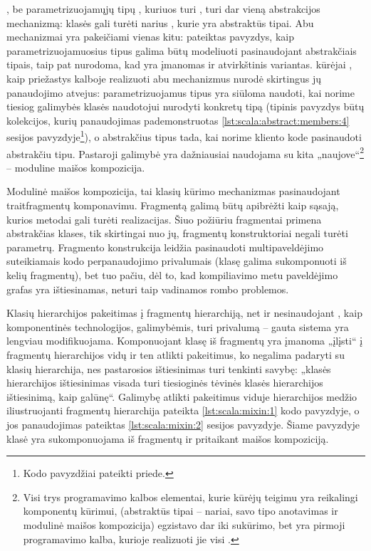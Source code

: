 , be parametrizuojamųjų tipų , kuriuos
turi , turi dar vieną abstrakcijos mechanizmą:
 klasės gali turėti narius , kurie
yra abstraktūs tipai. Abu mechanizmai yra pakeičiami vienas kitu:
\cite[10]{scala-overview} pateiktas pavyzdys, kaip parametrizuojamuosius
tipus galima būtų modeliuoti pasinaudojant abstrakčiais tipais, taip
pat nurodoma, kad yra įmanomas ir atvirkštinis variantas.
 kūrėjai \cite[11]{scala-overview}, kaip 
priežastys kalboje realizuoti abu mechanizmus nurodė skirtingus jų
panaudojimo atvejus: parametrizuojamus tipus yra siūloma naudoti, kai
norime tiesiog galimybės klasės naudotojui nurodyti konkretų tipą
(tipinis pavyzdys būtų kolekcijos, kurių panaudojimas pademonstruotas
\ref{lst:scala:abstract:members:4}  sesijos
pavyzdyje\footnote{Kodo pavyzdžiai pateikti priede.}), o abstrakčius
tipus tada, kai norime kliento kode
pasinaudoti abstrakčiu tipu. Pastaroji galimybė yra dažniausiai
naudojama su kita  „naujove“\footnote{
Visi trys programavimo kalbos elementai, kurie 
kūrėjų teigimu yra reikalingi komponentų kūrimui, (abstraktūs
tipai – nariai, savo tipo anotavimas ir modulinė maišos kompozicija)
egzistavo dar iki  sukūrimo, bet 
yra pirmoji programavimo kalba, kurioje realizuoti jie visi
\cite[2]{scalable-component-abstractions}.} – moduline maišos
kompozicija.



Modulinė maišos kompozicija, tai klasių kūrimo mechanizmas
pasinaudojant \gls{trait}{fragmentų}  komponavimu.
Fragmentą galimą būtų apibrėžti kaip sąsają, kurios metodai gali
turėti realizacijas. Šiuo požiūriu fragmentai primena abstrakčias
klases, tik skirtingai nuo jų, fragmentų konstruktoriai negali turėti
parametrų. Fragmento konstrukcija leidžia pasinaudoti
multipaveldėjimo suteikiamais kodo perpanaudojimo privalumais
(klasę galima sukomponuoti iš kelių fragmentų), bet tuo pačiu, dėl
to, kad kompiliavimo metu paveldėjimo grafas yra ištiesinamas, neturi
taip vadinamos rombo problemos.

Klasių hierarchijos pakeitimas į fragmentų hierarchiją, net ir
nesinaudojant , kaip komponentinės technologijos,
galimybėmis, turi privalumą –
gauta sistema yra lengviau modifikuojama. Komponuojant klasę iš
fragmentų yra įmanoma „įlįsti“ į fragmentų hierarchijos vidų
ir ten atlikti pakeitimus, ko negalima padaryti su klasių hierarchija,
nes pastarosios ištiesinimas turi tenkinti savybę: „klasės hierarchijos
ištiesinimas visada turi tiesioginės tėvinės klasės hierarchijos
ištiesinimą, kaip galūnę“\cite[57]{scala-reference}. Galimybę
atlikti pakeitimus viduje hierarchijos medžio iliustruojanti fragmentų
hierarchija pateikta \ref{lst:scala:mixin:1} kodo pavyzdyje,
o jos panaudojimas pateiktas \ref{lst:scala:mixin:2} 
sesijos pavyzdyje. Šiame pavyzdyje klasė  yra sukomponuojama
iš fragmentų  ir  pritaikant maišos kompoziciją.

